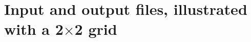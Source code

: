 \documentclass{article}
\newcommand{\code}[1]{\texttt{#1}}
\begin{document}
%
%
%
%
%		
%

\section{Input and output files, illustrated with a 2$\times$2 grid}
\end{document}
